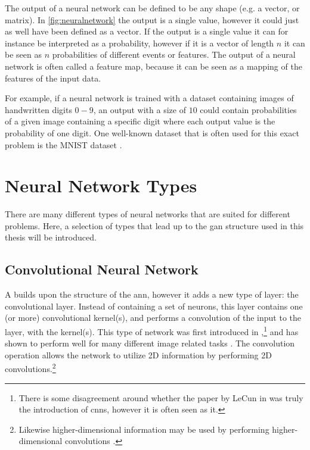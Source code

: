 The output of a neural network can be defined to be any shape (e.g. a vector, or matrix). In \cref{fig:neuralnetwork} the output is a single value, however it could just as well have been defined as a vector. If the output is a single value it can for instance be interpreted as a probability, however if it is a vector of length $n$ it can be seen as $n$ probabilities of different events or features. The output of a neural network is often called a feature map, because it can be seen as a mapping of the features of the input data. 

For example, if a neural network is trained with a dataset containing images of handwritten digits $0-9$, an output with a size of $10$ could contain probabilities of a given image containing a specific digit where each output value is the probability of one digit. One well-known dataset that is often used for this exact problem is the MNIST dataset \cite{mnist}.


\section{Neural Network Types}
There are many different types of neural networks that are suited for different problems. Here, a selection of types that lead up to the \gls{gan} structure used in this thesis will be introduced. 

\subsection{Convolutional Neural Network}
A  builds upon the structure of the \gls{ann}, however it adds a new type of layer: the convolutional layer. Instead of containing a set of neurons, this layer contains one (or more) convolutional kernel(s), and performs a convolution of the input to the layer, with the kernel(s). This type of network was first introduced in \citeyear{lecun1999object},\footnote{There is some disagreement around whether the paper by LeCun in \citeyear{lecun1999object} \cite{lecun1999object} was truly the introduction of \gls{cnn}s, however it is often seen as it. } and has shown to perform well for many different image related tasks \cite{lecun1999object,alexnet}. The convolution operation allows the network to utilize 2D information by performing 2D convolutions.\footnote{Likewise higher-dimensional information may be used by performing higher-dimensional convolutions \cite{8353466}. }

